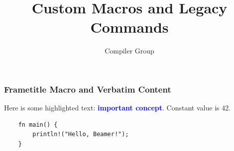 \documentclass{beamer}
\title{Custom Macros and Legacy Commands}
\author{Compiler Group}
\newcommand{\highlight}[1]{\textbf{\textcolor{blue}{#1}}}
\def\myconstant{42}
\begin{document}
\begin{frame}[fragile]
  \frametitle{Frametitle Macro and Verbatim Content}
  Here is some highlighted text: \highlight{important concept}.
  Constant value is \myconstant.

  \begin{verbatim}
    fn main() {
        println!("Hello, Beamer!");
    }
  \end{verbatim}
\end{frame}

\end{document}
